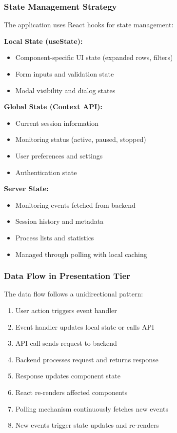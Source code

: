 \subsubsection{State Management Strategy}

The application uses React hooks for state management:

\textbf{Local State (useState):}
\begin{itemize}
    \item Component-specific UI state (expanded rows, filters)
    \item Form inputs and validation state
    \item Modal visibility and dialog states
\end{itemize}

\textbf{Global State (Context API):}
\begin{itemize}
    \item Current session information
    \item Monitoring status (active, paused, stopped)
    \item User preferences and settings
    \item Authentication state
\end{itemize}

\textbf{Server State:}
\begin{itemize}
    \item Monitoring events fetched from backend
    \item Session history and metadata
    \item Process lists and statistics
    \item Managed through polling with local caching
\end{itemize}

\subsubsection{Data Flow in Presentation Tier}

The data flow follows a unidirectional pattern:

\begin{enumerate}
    \item User action triggers event handler
    \item Event handler updates local state or calls API
    \item API call sends request to backend
    \item Backend processes request and returns response
    \item Response updates component state
    \item React re-renders affected components
    \item Polling mechanism continuously fetches new events
    \item New events trigger state updates and re-renders
\end{enumerate}

